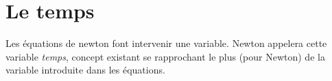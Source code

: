 \section{Le temps}

Les équations de newton font intervenir une variable. Newton appelera cette variable {\it temps}, concept existant se rapprochant le plus (pour Newton) de la variable introduite dans les équations.
